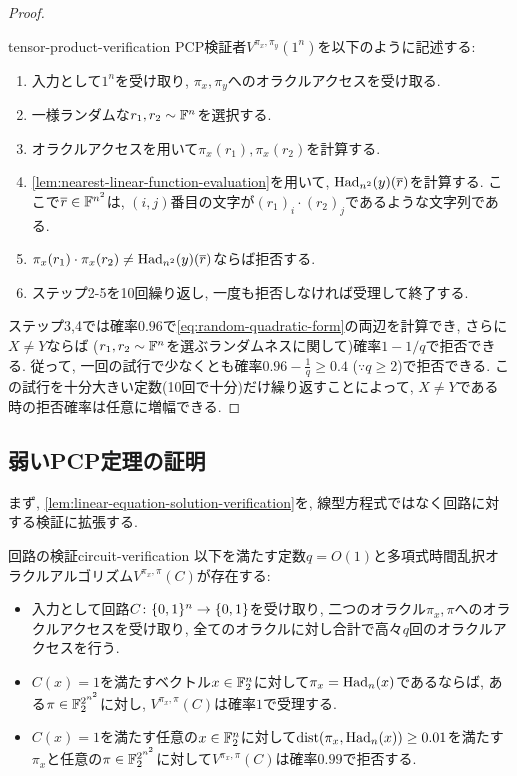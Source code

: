 \begin{proof}
  \begin{algo}{}{tensor-product-verification}
    PCP検証者$V^{\pi_x,\pi_y}(1^n)$を以下のように記述する:
    \begin{enumerate}
      \item 入力として$1^n$を受け取り, $\pi_x,\pi_y$へのオラクルアクセスを受け取る.
      \item 一様ランダムな$r_1,r_2\sim\mathbb{F}^n$を選択する.
      \item オラクルアクセスを用いて$\pi_x(r_1),\pi_x(r_2)$を計算する.
      \item \cref{lem:nearest-linear-function-evaluation}を用いて, $\mathrm{Had}_{n^2}(y)(\overline{r})$を計算する. ここで$\overline{r}\in\mathbb{F}^{n^2}$は, $(i,j)$番目の文字が$(r_1)_i\cdot (r_2)_j$であるような文字列である.
      \item $\pi_x(r_1)\cdot \pi_x(r_2)\ne \mathrm{Had}_{n^2}(y)(\overline{r})$ならば拒否する.
      \item ステップ2-5を10回繰り返し, 一度も拒否しなければ受理して終了する.
    \end{enumerate}
  \end{algo}

  ステップ3,4では確率$0.96$で\cref{eq:random-quadratic-form}の両辺を計算でき,
  さらに$X\ne Y$ならば ($r_1,r_2\sim\mathbb{F}^n$を選ぶランダムネスに関して)確率$1-1/q$で拒否できる.
  従って, 一回の試行で少なくとも確率$0.96-\frac{1}{q} \ge 0.4$ ($\because q\ge 2$)で拒否できる.
  この試行を十分大きい定数(10回で十分)だけ繰り返すことによって, $X\ne Y$である時の拒否確率は任意に増幅できる.
  \end{proof}
  
  \subsection{弱いPCP定理の証明}  

  
  まず, \cref{lem:linear-equation-solution-verification}を, 線型方程式ではなく回路に対する検証に拡張する.
  \begin{theorem}{回路の検証}{circuit-verification}
    以下を満たす定数$q=O(1)$と多項式時間乱択オラクルアルゴリズム$V^{\pi_x,\pi}(C)$が存在する:
    \begin{itemize}
      \item 入力として回路$C\colon \{0,1\}^n\to\{0,1\}$を受け取り, 二つのオラクル$\pi_x,\pi$へのオラクルアクセスを受け取り, 全てのオラクルに対し合計で高々$q$回のオラクルアクセスを行う.
      \item $C(x)=1$を満たすベクトル$x\in\mathbb{F}_2^n$に対して$\pi_x=\mathrm{Had}_n(x)$であるならば, ある$\pi\in \mathbb{F}_2^{2^{n^2}}$に対し, $V^{\pi_x,\pi}(C)$は確率$1$で受理する.
      \item $C(x)=1$を満たす任意の$x\in\mathbb{F}_2^n$に対して$\mathrm{dist}(\pi_x,\mathrm{Had}_n(x))\ge 0.01$を満たす$\pi_x$と任意の$\pi\in \mathbb{F}_2^{2^{n^2}}$に対して$V^{\pi_x,\pi}(C)$は確率$0.99$で拒否する.
    \end{itemize}
  \end{theorem}
  
